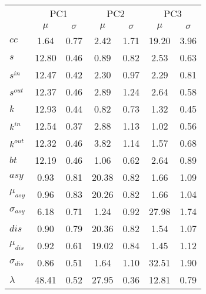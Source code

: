 \begin{center}
\begin{tabular}{| l | c | c | c | c | c | c |}\cline{2-7}
\multicolumn{1}{c|}{} & \multicolumn{2}{c|}{PC1}          & \multicolumn{2}{c|}{PC2} & \multicolumn{2}{c|}{PC3}  \\\cline{2-7}\multicolumn{1}{c|}{} & $\mu$            & $\sigma$ & $\mu$         & $\sigma$ & $\mu$ & $\sigma$  \\\hline
$cc$ & 1.64  & 0.77  & 2.42  & 1.71  & 19.20  & 3.96 \\\hline
$s$ & 12.80  & 0.46  & 0.89  & 0.82  & 2.53  & 0.63 \\
$s^{in}$ & 12.47  & 0.42  & 2.30  & 0.97  & 2.29  & 0.81 \\
$s^{out}$ & 12.37  & 0.46  & 2.89  & 1.24  & 2.64  & 0.58 \\
$k$ & 12.93  & 0.44  & 0.82  & 0.73  & 1.32  & 0.45 \\
$k^{in}$ & 12.54  & 0.37  & 2.88  & 1.13  & 1.02  & 0.56 \\
$k^{out}$ & 12.32  & 0.46  & 3.82  & 1.14  & 1.57  & 0.68 \\
$bt$ & 12.19  & 0.46  & 1.06  & 0.62  & 2.64  & 0.89 \\\hline
$asy$ & 0.93  & 0.81  & 20.38  & 0.82  & 1.66  & 1.09 \\
$\mu_{asy}$ & 0.96  & 0.83  & 20.26  & 0.82  & 1.66  & 1.04 \\
$\sigma_{asy}$ & 6.18  & 0.71  & 1.24  & 0.92  & 27.98  & 1.74 \\
$dis$ & 0.90  & 0.79  & 20.36  & 0.82  & 1.54  & 1.07 \\
$\mu_{dis}$ & 0.92  & 0.61  & 19.02  & 0.84  & 1.45  & 1.12 \\
$\sigma_{dis}$ & 0.86  & 0.51  & 1.64  & 1.10  & 32.51  & 1.90 \\\hline\hline
$\lambda$ & 48.41  & 0.52  & 27.95  & 0.36  & 12.81  & 0.79 \\
\hline\end{tabular}
\end{center}
